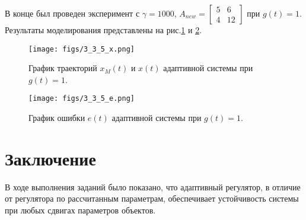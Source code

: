 \documentclass{article}
\begin{document}
В конце был проведен эксперимент с $\gamma=1000$, $A_{new} =\begin{bmatrix} 5 & 6 \\ 4 & 12\end{bmatrix}$ при $g(t) = 1$. Результаты моделирования представлены на рис.\ref{fig:3_3_5_x} и \ref{fig:3_3_5_e}.

\begin{figure}[h!]
  \centering
  \texttt{[image: figs/3\_3\_5\_x.png]}
  \caption{График траекторий $x_M(t)$ и $x(t)$ адаптивной системы при $g(t) = 1$.} 
  \label{fig:3_3_5_x}
\end{figure}

\begin{figure}[h!]
  \centering
  \texttt{[image: figs/3\_3\_5\_e.png]}
  \caption{График ошибки $e(t)$ адаптивной системы при $g(t) = 1$.} 
  \label{fig:3_3_5_e}
\end{figure}

\FloatBarrier
\section{Заключение}

В ходе выполнения заданий было показано, что адаптивный регулятор, в отличие от регулятора по рассчитанным параметрам, обеспечивает устойчивость системы при любых сдвигах параметров объектов.
\end{document}
